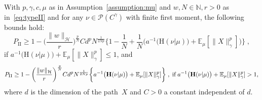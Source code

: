 \documentclass[twoside,11pt]{article}
\numberwithin{equation}{section}
\numberwithin{theorem}{section}
\newcommand{\N}{\mathbb{N}}
\newcommand{\ex}{\mathbb{E}}
\newcommand{\h}{\mathcal{H}}
\newcommand{\Hent}{\boldsymbol{\mathrm{H}}}
\begin{document}
\begin{theorem} 
\label{thm:Type-II_error}
With $p,\gamma, c, \mu$ as in Assumption~\ref{assumption:mu} and $w, N\in\N, r>0$ as in~\eqref{eq:typeII} and for any $\nu\in\mathscr{P}(C^\gamma)$ with finite first moment, the following bounds hold:
\begin{equation*}   P_{\mathrm{II}}\geq 1-\bigg(\frac{\|w\|_{\h}}{r}\bigg)^{\frac{p}{N}}Cd^pN^{\frac{1}{2Np}}\bigg\{ 1-\frac{1}{N}+ \frac{1}{N}\bigg(a^{-1}\big(\Hent(\nu|\mu)\big)  +\ex_\mu[\|X\|^{p}_\gamma]\bigg)  \bigg\}\;,
\end{equation*}
if $a^{-1}\big(\Hent(\nu|\mu)\big)  +\ex_\mu[\|X\|^{p}_\gamma]\leq 1$,
and
\begin{equation*}
   P_{\mathrm{II}}\geq
  1-\bigg(\frac{\|w\|_{\h}}{r}\bigg)^{\frac{p}{N}}Cd^pN^{\frac{1}{2Np}}\bigg\{ a^{-1}\big(\Hent(\nu|\mu)\big)  +\ex_\mu[\|X\|^{p}_\gamma]  \bigg\}\;,\; \textnormal{if}\;a^{-1}\big(\Hent(\nu|\mu)\big)  +\ex_\mu[\|X\|^{p}_\gamma]> 1, 
\end{equation*}
where $d$ is the dimension of the path~$X$ and $C>0$ a constant independent of $d$.
\end{theorem}
\end{document}

